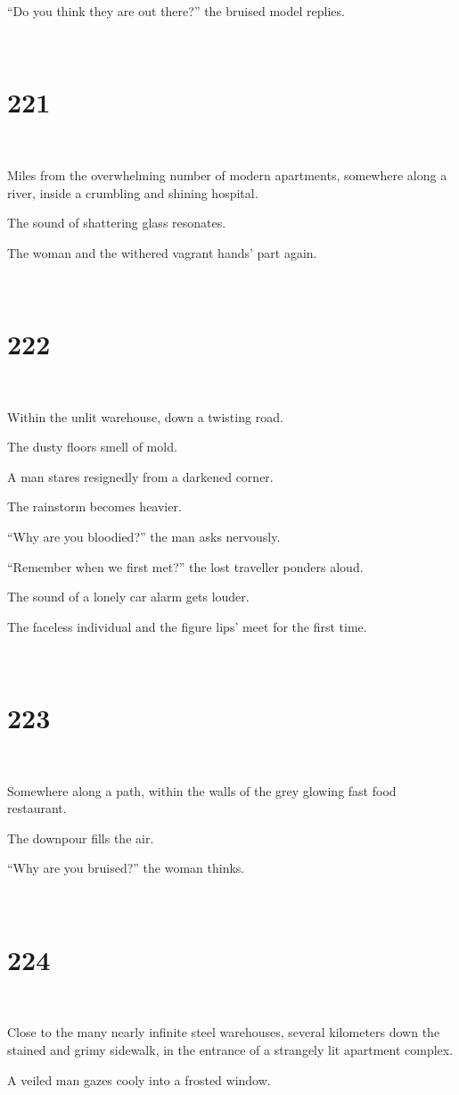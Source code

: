 \documentclass{report}
\begin{document}
``Do you think they are out there?'' the bruised model replies.

~
\chapter*{221}
~

Miles from the overwhelming number of modern apartments, somewhere along a river, inside a crumbling and shining hospital.

The sound of shattering glass resonates.

The woman and the withered vagrant hands' part again.

~
\chapter*{222}
~

Within the unlit warehouse, down a twisting road.

The dusty floors smell of mold.

A man stares resignedly from a darkened corner.

The rainstorm becomes heavier.

``Why are you bloodied?'' the man asks nervously.

``Remember when we first met?'' the lost traveller ponders aloud.

The sound of a lonely car alarm gets louder.

The faceless individual and the figure lips' meet for the first time.

~
\chapter*{223}
~

Somewhere along a path, within the walls of the grey glowing fast food restaurant.

The downpour fills the air.

``Why are you bruised?'' the woman thinks.

~
\chapter*{224}
~

Close to the many nearly infinite steel warehouses, several kilometers down the stained and grimy sidewalk, in the entrance of a strangely lit apartment complex.

A veiled man gazes cooly into a frosted window.
\end{document}
